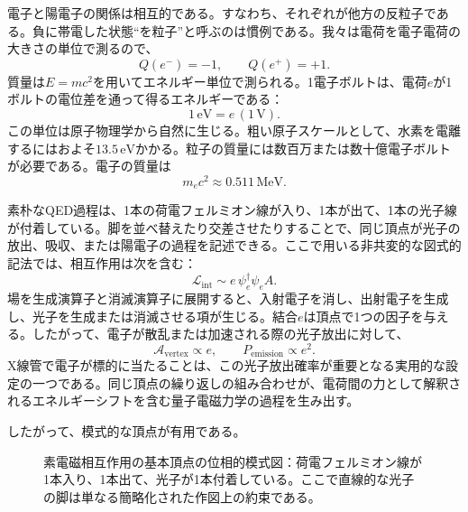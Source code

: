 電子と陽電子の関係は相互的である。すなわち、それぞれが他方の反粒子である。負に帯電した状態``を粒子''と呼ぶのは慣例である。我々は電荷を電子電荷の大きさの単位で測るので、
\begin{equation}
Q(e^-)=-1,\qquad Q(e^+)=+1.
\end{equation}
質量は\(E=mc^2\)を用いてエネルギー単位で測られる。1電子ボルトは、電荷\(e\)が1ボルトの電位差を通って得るエネルギーである：
\begin{equation}
1\,\mathrm{eV}=e\,(1\,\mathrm V).
\end{equation}
この単位は原子物理学から自然に生じる。粗い原子スケールとして、水素を電離するにはおよそ\(13.5\,\mathrm{eV}\)かかる。粒子の質量には数百万または数十億電子ボルトが必要である。電子の質量は
\begin{equation}
m_e c^2 \approx 0.511\,\mathrm{MeV}.
\end{equation}

\begin{classroomqa}
\end{classroomqa}

素朴なQED過程は、1本の荷電フェルミオン線が入り、1本が出て、1本の光子線が付着している。脚を並べ替えたり交差させたりすることで、同じ頂点が光子の放出、吸収、または陽電子の過程を記述できる。ここで用いる非共変的な図式的記法では、相互作用は次を含む：
\begin{equation}
\mathcal{L}_{\mathrm{int}}\sim e\,\psi_e^\dagger \psi_e A.
\end{equation}
場を生成演算子と消滅演算子に展開すると、入射電子を消し、出射電子を生成し、光子を生成または消滅させる項が生じる。結合\(e\)は頂点で1つの因子を与える。したがって、電子が散乱または加速される際の光子放出に対して、
\begin{equation}
\mathcal{A}_{\mathrm{vertex}}\propto e,
\qquad
P_{\mathrm{emission}}\propto e^2.
\end{equation}
X線管で電子が標的に当たることは、この光子放出確率が重要となる実用的な設定の一つである。同じ頂点の繰り返しの組み合わせが、電荷間の力として解釈されるエネルギーシフトを含む量子電磁力学の過程を生み出す。

したがって、模式的な頂点が有用である。

\begin{figure}[h]
\centering
{}
\caption{素電磁相互作用の基本頂点の位相的模式図：荷電フェルミオン線が1本入り、1本出て、光子が1本付着している。ここで直線的な光子の脚は単なる簡略化された作図上の約束である。}
\end{figure}

